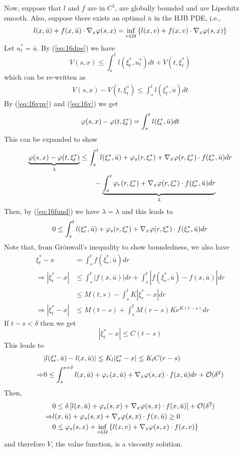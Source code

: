 Now, suppose that $l$ and $f$ are in $C^1$, are globally bounded and are Lipschitz smooth.
Also, suppose there exists an optimal $\bar{u}$ in the HJB PDE, i.e.,
\begin{align}
\label{eq:16ubar}
l(x,\bar{u})+f(x,\bar{u})\cdot\nabla_x\varphi(s,x) = \inf_{v\in\mathcal{U}}\left\lbrace l(x,v)+f(x,v)\cdot\nabla_x\varphi(s,x)\right\rbrace
\end{align}
Let $u_t^\ast=\bar{u}$.
By (\ref{eq:16dpe}) we have
$$V(s,x)\leq\int_s^t l(\xi_t^\ast,u_t^\ast)dt+V(t,\xi_t^\ast)$$
which can be re-written as
\begin{align}
\label{eq:16v}
V(s,x)-V(t,\xi_t^\ast)\leq\int_s^t l(\xi_t^\ast,\bar{u})dt
\end{align}
By (\ref{eq:16vpv}) and (\ref{eq:16v}) we get
$$\varphi(s,x)-\varphi(t,\xi_t^\ast) = \int_s^t l(\xi_t^\ast,\bar{u})dt$$
This can be expanded to show
\begin{align*}
\underbrace{\varphi(s,x) - \varphi(t,\xi_t^\ast)}_{\lambda} &\leq \int_s^t l(\xi_r^\ast,\bar{u}) + \varphi_s(r,\xi_r^\ast) + \nabla_x\varphi(r,\xi_r^\ast)\cdot f(\xi_r^\ast,\bar{u})dr \\
&\qquad - \underbrace{\int_s^t\varphi_r(r,\xi_r^\ast) + \nabla_x\varphi(r,\xi_r^\ast)\cdot f(\xi_r^\ast,\bar{u})dr}_{\lambda}
\end{align*}
Then, by (\ref{eq:16fund}) we have $\lambda=\lambda$ and this leads to
$$0\leq\int_s^t l(\xi_r^\ast,\bar{u}) + \varphi_s(r,\xi_r^\ast) + \nabla_x\varphi(r,\xi_r^\ast)\cdot f(\xi_r^\ast,\bar{u})dr$$
Note that, from Gr\"onwall's inequality to show boundedness, we also have
\begin{align*}
\xi_t^\ast-x &= \int_s^t f(\xi_r^\ast,\bar{u})dr \\
\Rightarrow |\xi_t^\ast-x| &\leq \int_s^t|f(x,\bar{u})|dr + \int_s^t|f(\xi_r^\ast,\bar{u})-f(x,\bar{u})|dr \\
&\leq M(t,s)-\int_s^t K|\xi_r^\ast-x|dr \\
\Rightarrow |\xi_t^\ast-x| &\leq M(t-s) + \int_s^t M(r-s)Ke^{K(t-s)}dr
\end{align*}
If $t-s<\delta$ then we get
$$|\xi_t^\ast-x|\leq C(t-s)$$
This leads to
\begin{align*}
&|l(\xi_r^\ast,\bar{u}) - l(x,\bar{u})| \leq K_l|\xi_r^\ast-x| \leq K_l C(r-s) \\
\Rightarrow &0 \leq \int_s^{s+\delta}l(x,\bar{u})+\varphi_r(x,\bar{u})+\nabla_x\varphi(s,x)\cdot f(x,\bar{u})dr + \mathcal{O}(\delta^2)
\end{align*}
Then,
\begin{align*}
&0 \leq \delta\left[ l(x,\bar{u})+\varphi_s(s,x)+\nabla_x\varphi(s,x)\cdot f(x,\bar{u})\right] + \mathcal{O}(\delta^2) \\
\Rightarrow &l(x,\bar{u}) + \varphi_s(s,x) + \nabla_x\varphi(s,x)\cdot f(x,\bar{u}) \geq 0 \\
&0 \leq \varphi_s(s,x) + \inf_{v\in\mathcal{U}}\left\lbrace l(x,v) + \nabla_x\varphi(s,x)\cdot f(x,v)\right\rbrace \\
\end{align*}
and therefore $V$, the value function, is a viscosity solution.

